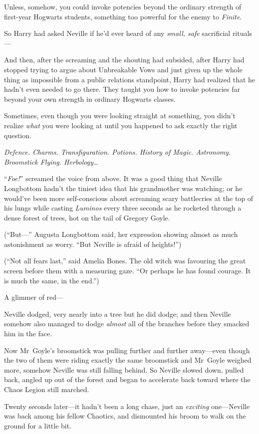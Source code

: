 Unless, somehow, you could invoke potencies beyond the ordinary strength of
first-year Hogwarts students, something too powerful for the enemy to
\emph{Finite}.

So Harry had asked Neville if he’d ever heard of any \emph{small, safe}
sacrificial rituals—

And then, after the screaming and the shouting had subsided, after Harry had
stopped trying to argue about Unbreakable Vows and just given up the whole
thing as impossible from a public relations standpoint, Harry had realized that
he hadn’t even needed to go there. They taught you how to invoke potencies far
beyond your own strength in ordinary Hogwarts classes.

Sometimes, even though you were looking straight at something, you didn’t
realize \emph{what} you were looking at until you happened to ask exactly the
right question.

\emph{Defence. Charms. Transfiguration. Potions. History of Magic. Astronomy.
Broomstick Flying. Herbology…}

“\emph{Foe!}” screamed the voice from above.
\later
It was a good thing that Neville Longbottom hadn’t the tiniest idea that his
grandmother was watching; or he would’ve been more self-conscious about
screaming scary battlecries at the top of his lungs while casting
\emph{Luminos} every three seconds as he rocketed through a dense forest of
trees, hot on the tail of Gregory Goyle.

(“But—” Augusta Longbottom said, her expression showing almost as much
astonishment as worry. “But Neville is afraid of heights!”)

(“Not all fears last,” said Amelia Bones. The old witch was favouring the great
screen before them with a measuring gaze. “Or perhaps he has found courage. It
is much the same, in the end.”)

A glimmer of red—

Neville dodged, very nearly into a tree but he did dodge; and then Neville
somehow also managed to dodge \emph{almost} all of the branches before they
smacked him in the face.

Now Mr~Goyle’s broomstick was pulling further and further away—even though
the two of them were riding exactly the same broomstick and Mr~Goyle weighed
more, somehow Neville was still falling behind. So Neville slowed down, pulled
back, angled up out of the forest and began to accelerate back toward where the
Chaos Legion still marched.

Twenty seconds later—it hadn’t been a long chase, just an \emph{exciting}
one—Neville was back among his fellow Chaotics, and dismounted his broom to
walk on the ground for a little bit.

